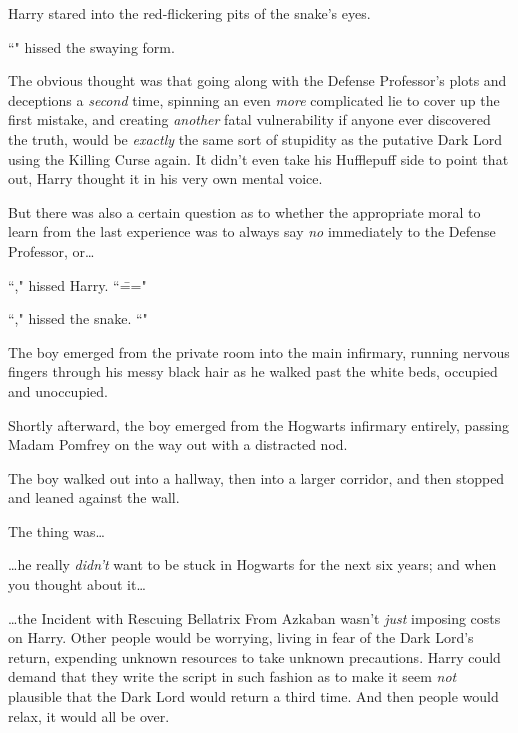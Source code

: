 Harry stared into the red-flickering pits of the snake's eyes.

``" hissed the swaying form.

The obvious thought was that going along with the Defense Professor's plots and deceptions a \emph{second} time, spinning an even \emph{more} complicated lie to cover up the first mistake, and creating \emph{another} fatal vulnerability if anyone ever discovered the truth, would be \emph{exactly} the same sort of stupidity as the putative Dark Lord using the Killing Curse again. It didn't even take his Hufflepuff side to point that out, Harry thought it in his very own mental voice.

But there was also a certain question as to whether the appropriate moral to learn from the last experience was to always say \emph{no} immediately to the Defense Professor, or{\ldots}

``," hissed Harry. ``\==="

``," hissed the snake. ``"

\later

The boy emerged from the private room into the main infirmary, running nervous fingers through his messy black hair as he walked past the white beds, occupied and unoccupied.

Shortly afterward, the boy emerged from the Hogwarts infirmary entirely, passing Madam Pomfrey on the way out with a distracted nod.

The boy walked out into a hallway, then into a larger corridor, and then stopped and leaned against the wall.

The thing was{\ldots}

{\ldots}he really \emph{didn't} want to be stuck in Hogwarts for the next six years; and when you thought about it{\ldots}

{\ldots}the Incident with Rescuing Bellatrix From Azkaban wasn't \emph{just} imposing costs on Harry. Other people would be worrying, living in fear of the Dark Lord's return, expending unknown resources to take unknown precautions. Harry could demand that they write the script in such fashion as to make it seem \emph{not} plausible that the Dark Lord would return a third time. And then people would relax, it would all be over.

